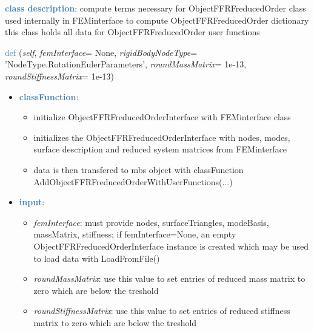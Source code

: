 \begin{itemize}[leftmargin=1.4cm]
\begin{itemize}[leftmargin=1.4cm]
\begin{itemize}[leftmargin=1.4cm]
\begin{itemize}[leftmargin=0.5cm]
\begin{itemize}[leftmargin=1.4cm]
\begin{itemize}[leftmargin=1.4cm]
\begin{itemize}[leftmargin=1.4cm]
\begin{itemize}[leftmargin=0.5cm]
%
\noindent\textcolor{steelblue}{{\bf class description}}:  compute terms necessary for ObjectFFRFreducedOrder
class used internally in FEMinterface to compute ObjectFFRFreducedOrder dictionary
this class holds all data for ObjectFFRFreducedOrder user functions
\vspace{3pt} \\ 
\begin{flushleft}
\noindent \textcolor{steelblue}{def {\bf {}}}\label{sec:FEM:ObjectFFRFreducedOrderInterface:__init__}
({\it self}, {\it femInterface}= None, {\it rigidBodyNodeType}= 'NodeType.RotationEulerParameters', {\it roundMassMatrix}= 1e-13, {\it roundStiffnessMatrix}= 1e-13)
\end{flushleft}
\setlength{\itemindent}{0.7cm}
\begin{itemize}[leftmargin=0.7cm]
\item[--]\textcolor{steelblue}{\bf classFunction}: \vspace{-6pt}
\begin{itemize}[leftmargin=1.2cm]
\setlength{\itemindent}{-0.7cm}
\item[]initialize ObjectFFRFreducedOrderInterface with FEMinterface class
\item[]initializes the ObjectFFRFreducedOrderInterface with nodes, modes, surface description and reduced system matrices from FEMinterface
\item[]data is then transfered to mbs object with classFunction AddObjectFFRFreducedOrderWithUserFunctions(...)
\end{itemize}
\item[--]\textcolor{steelblue}{\bf input}: \vspace{-6pt}
\begin{itemize}[leftmargin=1.2cm]
\setlength{\itemindent}{-0.7cm}
\item[]{\it femInterface}: must provide nodes, surfaceTriangles, modeBasis, massMatrix, stiffness; if femInterface=None, an empty ObjectFFRFreducedOrderInterface instance is created which may be used to load data with LoadFromFile()
\item[]{\it roundMassMatrix}: use this value to set entries of reduced mass matrix to zero which are below the treshold
\item[]{\it roundStiffnessMatrix}: use this value to set entries of reduced stiffness matrix to zero which are below the treshold

\end{itemize}
\end{itemize}
\end{itemize}
\end{itemize}
\end{itemize}
\end{itemize}
\end{itemize}
\end{itemize}
\end{itemize}
\end{itemize}
